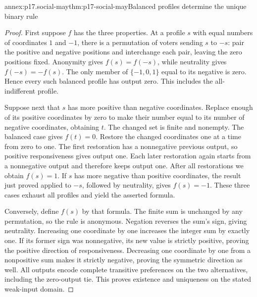\begin{annexitem}{annex:p17.social-may}{thm:p17-social-may}{Balanced profiles determine the unique binary rule}
\begin{proof}
First suppose \(f\) has the three properties. At a profile \(s\) with
equal numbers of coordinates \(1\) and \(-1\), there is a permutation
of voters sending \(s\) to \(-s\): pair the positive and negative
positions and interchange each pair, leaving the zero positions fixed.
Anonymity gives \(f(s)=f(-s)\), while neutrality gives
\(f(-s)=-f(s)\). The only member of \(\{-1,0,1\}\) equal to its
negative is zero. Hence every such balanced profile has output zero.
This includes the all-indifferent profile.

Suppose next that \(s\) has more positive than negative coordinates.
Replace enough of its positive coordinates by zero to make their number
equal to its number of negative coordinates, obtaining \(t\).
The changed set is finite and nonempty. The balanced case gives
\(f(t)=0\). Restore the changed coordinates one at a time from zero
to one. The first restoration has a nonnegative previous output, so
positive responsiveness gives output one. Each later restoration again
starts from a nonnegative output and therefore keeps output one.
After all restorations we obtain \(f(s)=1\).
If \(s\) has more negative than positive coordinates, the result just
proved applied to \(-s\), followed by neutrality, gives \(f(s)=-1\).
These three cases exhaust all profiles and yield the asserted formula.

Conversely, define \(f(s)\) by that formula. The finite sum is unchanged
by any permutation, so the rule is anonymous. Negation reverses the
sum's sign, giving neutrality. Increasing one coordinate by one
increases the integer sum by exactly one. If its former sign was
nonnegative, its new value is strictly positive, proving the positive
direction of responsiveness. Decreasing one coordinate by one from
a nonpositive sum makes it strictly negative, proving the symmetric
direction as well. All outputs encode complete transitive preferences
on the two alternatives, including the zero-output tie.
This proves existence and uniqueness on the stated weak-input domain.
\end{proof}
\end{annexitem}


